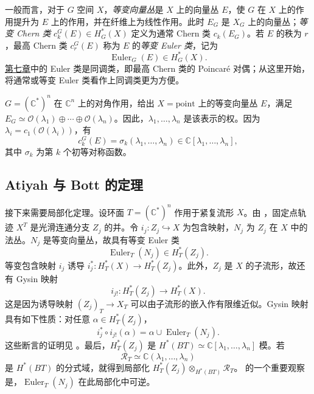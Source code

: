 一般而言，对于 $G$ 空间 $X$，\emph{等变向量丛}是 $X$ 上的向量丛 $E$，使 $G$ 在 $X$ 上的作用提升为 $E$ 上的作用，并在纤维上为线性作用。此时 $E_G$ 是 $X_G$ 上的向量丛；\emph{等变 Chern 类} $c_k^G(E)\in H_G^*(X)$ 定义为通常 Chern 类 $c_k(E_G)$。若 $E$ 的秩为 $r$，最高 Chern 类 $c_r^G(E)$ 称为 $E$ 的\emph{等变 Euler 类}，记为
\[
\operatorname{Euler}_G(E)\in H_G^*(X).
\]
\hyperref[chap:gromov-witten]{第七章}中的 Euler 类是同调类，即最高 Chern 类的 Poincaré 对偶；从这里开始，将通常或等变 Euler 类看作上同调类更为方便。
\begin{example}\label{ex:diagonal-equivariant-chern}
$G=(\mathbb C^*)^n$ 在 $\mathbb C^n$ 上的对角作用，给出 $X=\mathrm{point}$ 上的等变向量丛 $E$，满足 $E_G\simeq\mathcal O(\lambda_1)\oplus\cdots\oplus\mathcal O(\lambda_n)$。因此，$\lambda_1,\ldots,\lambda_n$ 是该表示的权。因为 $\lambda_i=c_1(\mathcal O(\lambda_i))$，有
\begin{equation}\label{eq:equivariant-chern-symmetric}
c_k^G(E)=\sigma_k(\lambda_1,\ldots,\lambda_n)\in\mathbb C[\lambda_1,\ldots,\lambda_n],
\end{equation}
其中 $\sigma_k$ 为第 $k$ 个初等对称函数。
\end{example}
\subsection{Atiyah 与 Bott 的定理}\label{subsec:atiyah-bott-localization}
接下来需要局部化定理。设环面 $T=(\mathbb C^*)^n$ 作用于紧复流形 $X$。由 ，固定点轨迹 $X^T$ 是光滑连通分支 $Z_j$ 的并。令 $i_j:Z_j\hookrightarrow X$ 为包含映射，$N_j$ 为 $Z_j$ 在 $X$ 中的法丛。$N_j$ 是等变向量丛，故具有等变 Euler 类
\[
\operatorname{Euler}_T(N_j)\in H_T^*(Z_j).
\]
等变包含映射 $i_j$ 诱导 $i_j^*:H_T^*(X)\to H_T^*(Z_j)$。此外，$Z_j$ 是 $X$ 的子流形，故还有 Gysin 映射
\[
i_{j!}:H_T^*(Z_j)\longrightarrow H_T^*(X).
\]
这是因为诱导映射 $(Z_j)_T\to X_T$ 可以由子流形的嵌入作有限维近似。Gysin 映射具有如下性质：对任意 $\alpha\in H_T^*(Z_j)$，
\begin{equation}\label{eq:equivariant-self-intersection}
i_j^*\circ i_{j!}(\alpha)=\alpha\cup\operatorname{Euler}_T(N_j).
\end{equation}
这些断言的证明见 。最后，$H_T^*(Z_j)$ 是 $H^*(BT)\simeq\mathbb C[\lambda_1,\ldots,\lambda_n]$ 模。若
\[
\mathcal R_T\simeq\mathbb C(\lambda_1,\ldots,\lambda_n)
\]
是 $H^*(BT)$ 的分式域，就得到局部化 $H_T^*(Z_j)\otimes_{H^*(BT)}\mathcal R_T$。 的一个重要观察是，$\operatorname{Euler}_T(N_j)$ 在此局部化中可逆。

